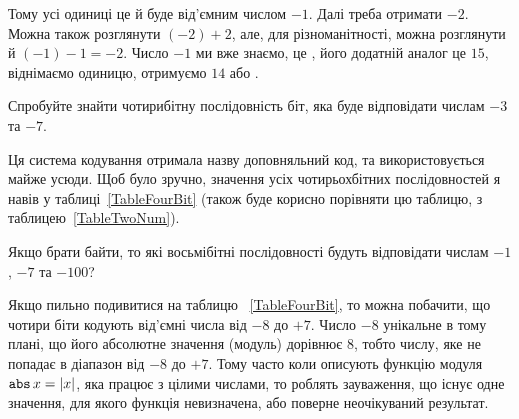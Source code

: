 Тому усі одиниці це й буде від'ємним числом $-1$.
Далі треба отримати $-2$.
Можна також розглянути $(-2) + 2$, але, для різноманітності, можна розглянути й $(-1) - 1 = -2$.
Число $-1$ ми вже знаємо, це , його додатній аналог це $15$, віднімаємо одиницю, отримуємо $14$ або .

\begin{exercise}
Спробуйте знайти чотирибітну послідовність біт, яка буде відповідати числам $-3$ та $-7$.
\end{exercise}


Ця система кодування отримала назву доповняльний код, та використовується майже усюди.
Щоб було зручно, значення усіх чотирьохбітних послідовностей я навів у таблиці~\ref{TableFourBit} (також буде корисно порівняти цю таблицю, з таблицею~\ref{TableTwoNum}).

\begin{exercise}
Якщо брати байти, то які восьмібітні послідовності будуть відповідати числам $-1$, $-7$ та $-100$?
\end{exercise}

Якщо пильно подивитися на таблицю ~\ref{TableFourBit}, то можна побачити, що чотири біти кодують від'ємні числа від $-8$ до $+7$.
Число $-8$ унікальне в тому плані, що його абсолютне значення (модуль) дорівнює $8$, тобто числу, яке не попадає в діапазон від $-8$ до $+7$.
Тому часто коли описують функцію модуля $\operatorname{\hbox{\texttt{abs}}} x = |x|$, яка працює з цілими числами, то роблять зауваження, що існує одне значення, для якого функція невизначена, або поверне неочікуваний результат.

